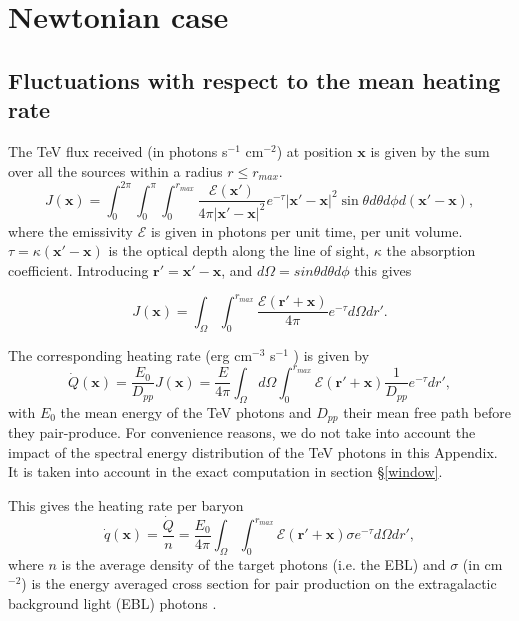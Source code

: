 \documentclass[twocolumns]{emulateapj}
\begin{document}
\section {Newtonian case}\label{sec:windon_newt}

\subsection {Fluctuations with respect to the mean heating rate}

The TeV flux received (in photons s$^{-1}$ cm$^{-2}$) at position $\mathbf{x}$ is given by the sum over all the sources within a radius $r\leqslant r_{max}$.
\begin{equation}
  \label{eq:flux_recu0}
  J(\mathbf{x})=\int_{0}^{2\pi}\int_{0}^{\pi}\int_0^{r_{max}}   \frac{\mathcal{E}(\mathbf{x}') }{4\pi |\mathbf{x}'-\mathbf{x}|^2} e^{-\tau} |\mathbf{x}'-\mathbf{x}|^2 \sin\theta d\theta d\phi d(\mathbf{x}'-\mathbf{x}),
\end{equation}
where the emissivity $\mathcal{E}$ is given in photons per unit time, per unit volume. $\tau=\kappa (\mathbf{x}'-\mathbf{x})$ is the optical depth along the line of sight, $\kappa$ the absorption coefficient.
Introducing $\mathbf{r'}=\mathbf{x}'-\mathbf{x}$, and $d\Omega=sin\theta d\theta d\phi$ this gives


\begin{equation}
  \label{eq:flux_recu}
  J(\mathbf{x})=\int_{\Omega}\int_0^{r_{max}}   \frac{\mathcal{E}(\mathbf{r}'+\mathbf{x}) }{4\pi } e^{-\tau} d\Omega dr'.
\end{equation}

The corresponding heating rate (erg cm$^{-3}$ s$^{-1}$ ) is given by 
\begin{equation}
  \label{eq:heating_rate0}
  \dot{Q}(\mathbf{x})=\frac{E_0}{D_{pp}}J(\mathbf{x}) =\frac{E}{4\pi}   \int_{\Omega}d\Omega\int_0^{r_{max}}   \mathcal{E}(\mathbf{r}'+\mathbf{x}) \frac{1}{D_{pp}}  e^{-\tau} dr' ,
\end{equation}
with $E_0$ the mean energy of the TeV photons and $D_{pp}$ their mean free path  before they pair-produce. For convenience reasons,  we  do not take into account the impact of the spectral energy distribution of the TeV photons in this Appendix. It is taken into account in the exact computation in section \S\ref{window}.

This gives the  heating rate per baryon
\begin{equation}
  \label{eq:heating_rate0}
  \dot{q}(\mathbf{x})=\frac{\dot{Q}}{n}= \frac{E_0}{4\pi}  \int_{\Omega}\int_0^{r_{max}}   \mathcal{E}(\mathbf{r}'+\mathbf{x})\sigma  e^{-\tau}d\Omega dr' ,
\end{equation}
where $n$ is the average density of the target photons (i.e. the EBL) and $\sigma$ (in cm$^{-2}$) is the energy averaged cross section for pair production on the extragalactic background light (EBL) photons \citep{1967PhRv..155.1408G}. 
\end{document}
